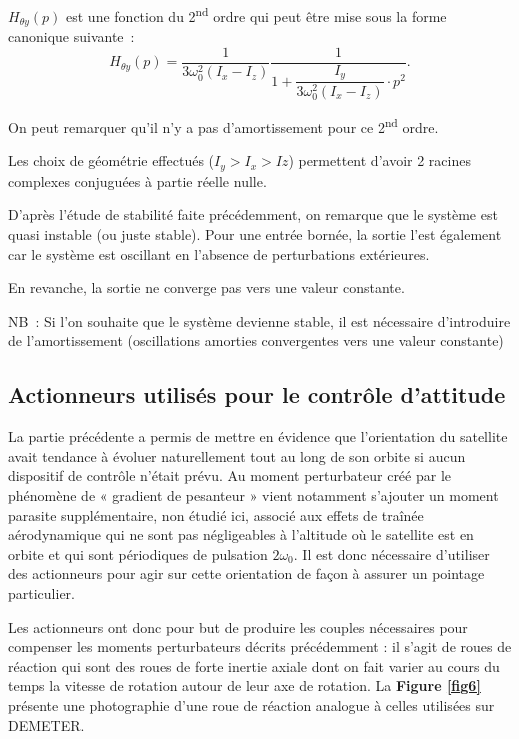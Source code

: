 \begin{corrige}
$H_{\theta y}(p)$ est une fonction du 2\textsuperscript{nd} ordre qui peut être mise sous
la forme canonique suivante~: 
$$
  H_{\theta y}(p)=\dfrac{1}{3\omega_0^2\left(I_x-I_z\right)}\dfrac{1}{1+\dfrac{I_y}{3\omega_0^2\left(I_x-I_z\right)}\cdot p^2}.$$

On peut remarquer qu'il n'y a pas d'amortissement pour ce
2\textsuperscript{nd} ordre.

Les choix de géométrie effectués ($I_y>I_x>Iz$) permettent d'avoir 2 racines
complexes conjuguées à partie réelle nulle.

D'après l'étude de stabilité faite précédemment, on remarque que le
système est quasi instable (ou juste stable). Pour une entrée bornée, la
sortie l'est également car le système est oscillant en l'absence de
perturbations extérieures.

En revanche, la sortie ne converge pas vers une valeur constante.

NB~: Si l'on souhaite que le système devienne stable, il est nécessaire
d'introduire de l'amortissement (oscillations amorties convergentes vers
une valeur constante)


\end{corrige}
\else
\fi

 



\subsection{Actionneurs utilisés pour le contrôle d'attitude}

\ifprof
\else
La partie précédente a permis de mettre en évidence que l'orientation du
satellite avait tendance à évoluer naturellement tout au long de son
orbite si aucun dispositif de contrôle n'était prévu. Au moment
perturbateur créé par le phénomène de « gradient de pesanteur » vient
notamment s'ajouter un moment parasite supplémentaire, non étudié ici,
associé aux effets de traînée aérodynamique qui ne sont pas négligeables
à l'altitude où le satellite est en orbite et qui sont périodiques de
pulsation $2\omega_0$. Il est donc nécessaire d'utiliser des actionneurs pour agir
sur cette orientation de façon à assurer un pointage particulier.

Les actionneurs ont donc pour but de produire les couples nécessaires
pour compenser les moments perturbateurs décrits précédemment : il
s'agit de roues de réaction qui sont des roues de forte inertie axiale
dont on fait varier au cours du temps la vitesse de rotation autour de
leur axe de rotation. La \textbf{Figure \ref{fig6}} présente une photographie
d'une roue de réaction analogue à celles utilisées sur DEMETER.


